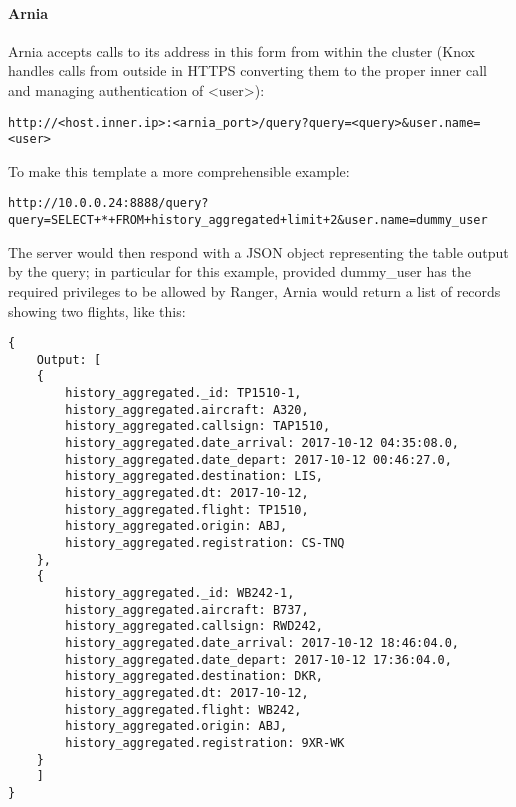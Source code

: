 \paragraph{Arnia}

Arnia accepts calls to its address in this form from within the cluster (Knox handles calls from outside in HTTPS converting them to the proper inner call and managing authentication of <user>): 

\begin{code}
	\begin{verbatim}
http://<host.inner.ip>:<arnia_port>/query?query=<query>&user.name=<user>
	\end{verbatim}
\end{code}

To make this template a more comprehensible example:

\begin{code}
	\begin{verbatim}
http://10.0.0.24:8888/query?query=SELECT+*+FROM+history_aggregated+limit+2&user.name=dummy_user
	\end{verbatim}
\end{code}

\pagebreak
The server would then respond with a JSON object representing the table output by the query; in particular for this example, provided dummy\_user has the required privileges to be allowed by Ranger, Arnia would return a list of records showing two flights, like this:

\begin{code}
	\begin{verbatim}
{
    Output: [
    {
        history_aggregated._id: TP1510-1, 
        history_aggregated.aircraft: A320, 
        history_aggregated.callsign: TAP1510, 
        history_aggregated.date_arrival: 2017-10-12 04:35:08.0, 
        history_aggregated.date_depart: 2017-10-12 00:46:27.0, 
        history_aggregated.destination: LIS, 
        history_aggregated.dt: 2017-10-12, 
        history_aggregated.flight: TP1510, 
        history_aggregated.origin: ABJ, 
        history_aggregated.registration: CS-TNQ
    }, 
    {
        history_aggregated._id: WB242-1, 
        history_aggregated.aircraft: B737, 
        history_aggregated.callsign: RWD242, 
        history_aggregated.date_arrival: 2017-10-12 18:46:04.0, 
        history_aggregated.date_depart: 2017-10-12 17:36:04.0, 
        history_aggregated.destination: DKR, 
        history_aggregated.dt: 2017-10-12, 
        history_aggregated.flight: WB242, 
        history_aggregated.origin: ABJ, 
        history_aggregated.registration: 9XR-WK
    }
    ]
}
	\end{verbatim}
\end{code}

